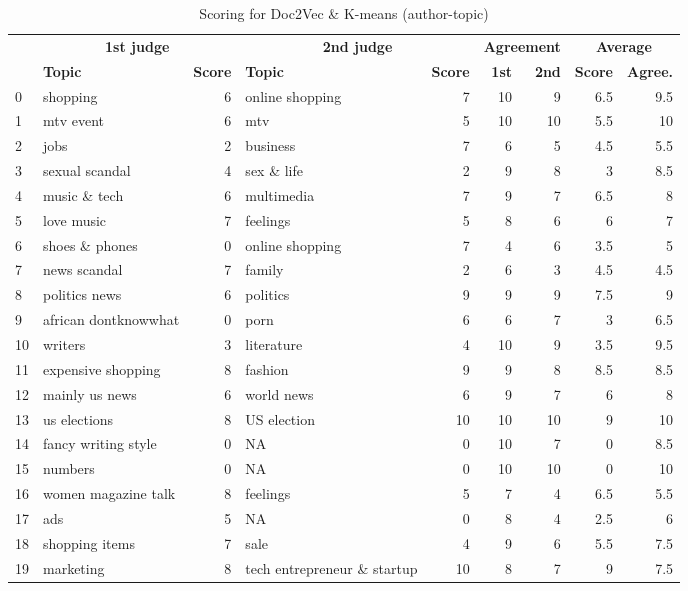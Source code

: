 \documentclass[11pt]{article}
\begin{document}
\begin{appendices}
\begin{table}[H]
	\centering
	\begin{tabular}{| l | p{2.7cm} | r | p{2.7cm} | r | r | r | r | r |}
		\hline
		& \multicolumn{2}{c|}{\textbf{1st judge}} & \multicolumn{2}{c|}{\textbf{2nd judge}} & \multicolumn{2}{c|}{\textbf{Agreement}} & \multicolumn{2}{c|}{\textbf{Average}}\\
        \cline{2-9}
         & \textbf{Topic} & \textbf{Score} & \textbf{Topic} & \textbf{Score} & \textbf{1st} & \textbf{2nd} & \textbf{Score} & \textbf{Agree.}\\
		\hline
        0 & shopping & 6 & online shopping & 7 & 10 & 9 & 6.5 & 9.5\\
        1 & mtv event & 6 & mtv & 5 & 10 & 10 & 5.5 & 10\\
        2 & jobs & 2 & business & 7 & 6 & 5 & 4.5 & 5.5\\
        3 & sexual scandal & 4 & sex \& life & 2 & 9 & 8 & 3 & 8.5\\
        4 & music \& tech & 6 & multimedia & 7 & 9 & 7 & 6.5 & 8\\
        5 & love music & 7 & feelings & 5 & 8 & 6 & 6 & 7\\
        6 & shoes \& phones & 0 & online shopping & 7 & 4 & 6 & 3.5 & 5\\
        7 & news scandal & 7 & family & 2 & 6 & 3 & 4.5 & 4.5\\
        8 & politics news & 6 & politics & 9 & 9 & 9 & 7.5 & 9\\
        9 & african dontknowwhat & 0 & porn & 6 & 6 & 7 & 3 & 6.5\\
        10 & writers & 3 & literature & 4 & 10 & 9 & 3.5 & 9.5\\
        11 & expensive shopping & 8 & fashion & 9 & 9 & 8 & 8.5 & 8.5\\
        12 & mainly us news & 6 & world news & 6 & 9 & 7 & 6 & 8\\
        13 & us elections & 8 & US election & 10 & 10 & 10 & 9 & 10\\
        14 & fancy writing style & 0 & NA & 0 & 10 & 7 & 0 & 8.5\\
        15 & numbers & 0 & NA & 0 & 10 & 10 & 0 & 10\\
        16 & women magazine talk & 8 & feelings & 5 & 7 & 4 & 6.5 & 5.5\\
        17 & ads & 5 & NA & 0 & 8 & 4 & 2.5 & 6\\
        18 & shopping items & 7 & sale & 4 & 9 & 6 & 5.5 & 7.5\\
        19 & marketing & 8 & tech entrepreneur \& startup & 10 & 8 & 7 & 9 & 7.5\\
		\hline
	\end{tabular}
	\caption{Scoring for Doc2Vec \& K-means (author-topic)}
	\label{tb:res_doc_grp}
\end{table}

\end{appendices}
\end{document}
